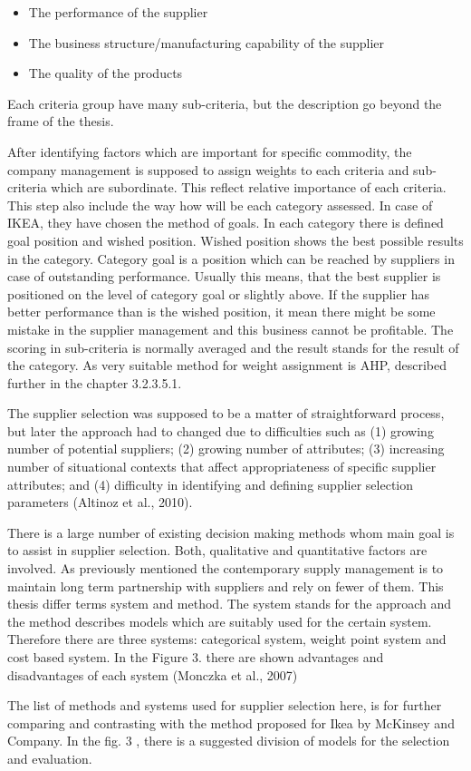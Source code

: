 \documentclass[oneside,12pt]{article}%
\begin{document}
  \begin{itemize}
    \item The performance of the supplier
    \item The business structure/manufacturing capability of the supplier
    \item The quality of the products
  \end{itemize}

Each criteria group have many sub-criteria, but the description go beyond the frame of the thesis.

After identifying factors which are important for specific commodity, the company management is supposed to assign weights to each criteria and sub-criteria which are subordinate. This reflect relative importance of each criteria. This step also include the way how will be each category assessed. In case of IKEA, they have chosen the method of goals. In each category there is defined goal position and wished position. Wished position shows the best possible results in the category. Category goal is a position which can be reached by suppliers in case of outstanding performance. Usually this means, that the best supplier is positioned on the level of category goal or slightly above. If the supplier has better performance than is the wished position, it mean there might be some mistake in the supplier management and this business cannot be profitable. The scoring in sub-criteria is normally averaged and the result stands for the result of the category. As very suitable method for weight assignment is AHP, described further in the chapter 3.2.3.5.1.


The supplier selection was supposed to be a matter of straightforward process, but later the approach had to changed due to difficulties such as (1) growing number of potential suppliers; (2) growing number of attributes; (3) increasing number of situational contexts that affect appropriateness of specific supplier attributes; and (4) difficulty in identifying and defining supplier selection parameters (Altinoz et al., 2010). \par
There is a large number of existing decision making methods whom main goal is to assist in supplier selection. Both, qualitative and quantitative factors are involved. As previously mentioned the contemporary supply management is to maintain long term partnership with suppliers and rely on fewer of them. This thesis differ terms system and method. The system stands for the approach and the method describes models which are suitably used for the certain system. Therefore there are three systems: categorical system, weight point system and cost based system. In the Figure 3. there are shown advantages and disadvantages of each system (Monczka et al., 2007)\par
The list of methods and systems used for supplier selection here, is for further comparing and contrasting with the method proposed for Ikea by McKinsey and Company. In the fig. 3 , there is a suggested division of models for the selection and evaluation.
\end{document}
